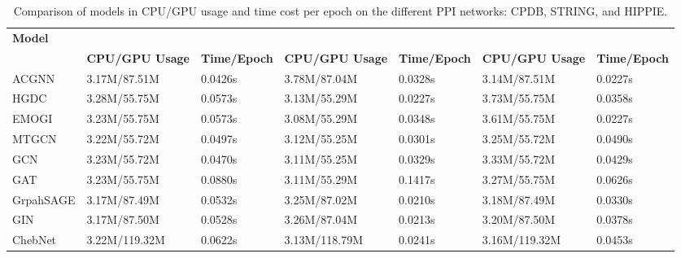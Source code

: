 \begin{table}[ht]
	\centering
	\scriptsize
	\captionsetup{font=footnotesize}
	\begin{tabular}{l*{6}{>{\centering\arraybackslash}p{1.8cm}}}
		\toprule
		\textbf{Model} & \multicolumn{2}{c}{\textbf{CPDB}} & \multicolumn{2}{c}{\textbf{STRING}} & \multicolumn{2}{c}{\textbf{HIPPIE}} \\
		\cmidrule(lr){2-3} \cmidrule(lr){4-5} \cmidrule(lr){6-7}
		& \textbf{CPU/GPU Usage} & \textbf{Time/Epoch} & \textbf{CPU/GPU Usage} & \textbf{Time/Epoch} & \textbf{CPU/GPU Usage} & \textbf{Time/Epoch} \\
		\midrule
		ACGNN    & 3.17M/87.51M & 0.0426s & 3.78M/87.04M & 0.0328s & 3.14M/87.51M & 0.0227s\\
		HGDC     & 3.28M/55.75M & 0.0573s & 3.13M/55.29M & 0.0227s & 3.73M/55.75M & 0.0358s \\
		EMOGI   & 3.23M/55.75M & 0.0573s & 3.08M/55.29M & 0.0348s & 3.61M/55.75M & 0.0227s \\
		MTGCN   & 3.22M/55.72M & 0.0497s & 3.12M/55.25M & 0.0301s & 3.25M/55.72M & 0.0490s \\
		GCN     & 3.23M/55.72M & 0.0470s & 3.11M/55.25M & 0.0329s & 3.33M/55.72M & 0.0429s\\
		GAT     & 3.23M/55.75M & 0.0880s & 3.11M/55.29M & 0.1417s & 3.27M/55.75M & 0.0626s\\
		GrpahSAGE     & 3.17M/87.49M & 0.0532s & 3.25M/87.02M & 0.0210s & 3.18M/87.49M & 0.0330s \\
		GIN     & 3.17M/87.50M  & 0.0528s & 3.26M/87.04M & 0.0213s& 3.20M/87.50M & 0.0378s \\
		ChebNet & 3.22M/119.32M & 0.0622s & 3.13M/118.79M & 0.0241s & 3.16M/119.32M & 0.0453s \\
		\bottomrule
	\end{tabular}
	\caption{Comparison of models in CPU/GPU usage and time cost per epoch on the different PPI networks: CPDB, STRING, and HIPPIE.}
	\label{tab:consume_gpu}
\end{table}


